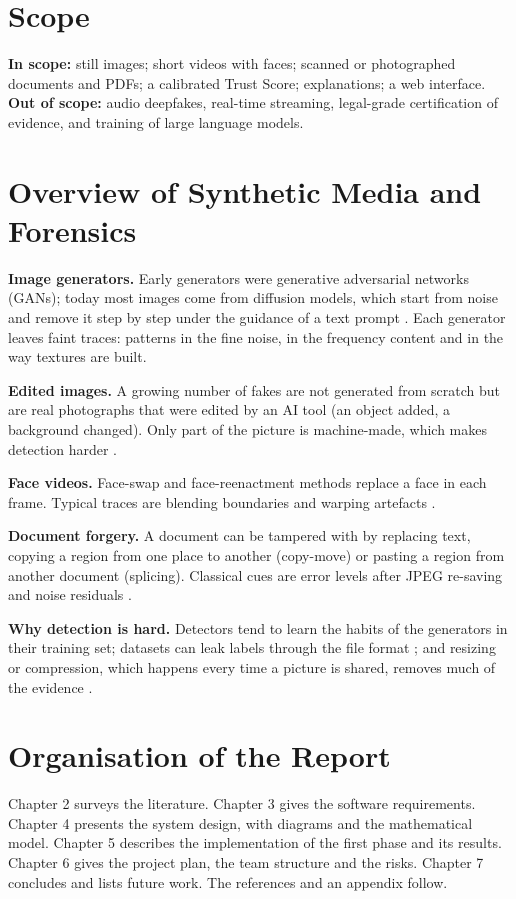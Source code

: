 \section{Scope}
\textbf{In scope:} still images; short videos with faces; scanned or photographed documents and PDFs; a calibrated Trust Score; explanations; a web interface.\\
\textbf{Out of scope:} audio deepfakes, real-time streaming, legal-grade certification of evidence, and training of large language models.

\section{Overview of Synthetic Media and Forensics}
\textbf{Image generators.} Early generators were generative adversarial networks (GANs); today most images come from diffusion models, which start from noise and remove it step by step under the guidance of a text prompt \cite{rombach}. Each generator leaves faint traces: patterns in the fine noise, in the frequency content and in the way textures are built.

\textbf{Edited images.} A growing number of fakes are not generated from scratch but are real photographs that were edited by an AI tool (an object added, a background changed). Only part of the picture is machine-made, which makes detection harder \cite{diffseg}.

\textbf{Face videos.} Face-swap and face-reenactment methods replace a face in each frame. Typical traces are blending boundaries and warping artefacts \cite{li}.

\textbf{Document forgery.} A document can be tampered with by replacing text, copying a region from one place to another (copy-move) or pasting a region from another document (splicing). Classical cues are error levels after JPEG re-saving \cite{krawetz} and noise residuals \cite{fridrich}.

\textbf{Why detection is hard.} Detectors tend to learn the habits of the generators in their training set; datasets can leak labels through the file format \cite{grommelt}; and resizing or compression, which happens every time a picture is shared, removes much of the evidence \cite{corvi}.

\section{Organisation of the Report}
Chapter 2 surveys the literature. Chapter 3 gives the software requirements. Chapter 4 presents the system design, with diagrams and the mathematical model. Chapter 5 describes the implementation of the first phase and its results. Chapter 6 gives the project plan, the team structure and the risks. Chapter 7 concludes and lists future work. The references and an appendix follow.
